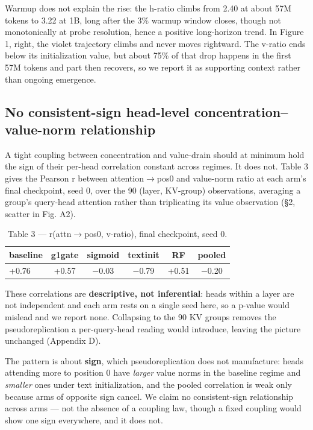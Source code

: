 \documentclass{article}
\begin{document}
Warmup does not explain the rise: the h-ratio climbs from 2.40 at about 57M tokens to 3.22 at 1B, long after the 3\% warmup window closes, though not monotonically at probe resolution, hence a positive long-horizon trend. In Figure 1, right, the violet trajectory climbs and never moves rightward. The v-ratio ends below its initialization value, but about 75\% of that drop happens in the first 57M tokens and part then recovers, so we report it as supporting context rather than ongoing emergence.

\subsection{No consistent-sign head-level concentration--value-norm relationship}

A tight coupling between concentration and value-drain should at minimum hold the sign of their per-head correlation constant across regimes. It does not. Table 3 gives the Pearson r between attention$\rightarrow$pos0 and value-norm ratio at each arm's final checkpoint, seed 0, over the 90 (layer, KV-group) observations, averaging a group's query-head attention rather than triplicating its value observation (\S2, scatter in Fig. A2).

\begin{table}[t]
  \centering
  \small
  \caption{Table 3 --- r(attn$\rightarrow$pos0, v-ratio), final checkpoint, seed 0.}
  \begin{tabular}{lccccc}
    \toprule
    baseline & g1gate & sigmoid & textinit & RF & pooled \\
    \midrule
    +0.76 & +0.57 & $-$0.03 & $-$0.79 & +0.51 & $-$0.20 \\
    \bottomrule
  \end{tabular}
\end{table}

These correlations are \textbf{descriptive, not inferential}: heads within a layer are not independent and each arm rests on a single seed here, so a p-value would mislead and we report none. Collapsing to the 90 KV groups removes the pseudoreplication a per-query-head reading would introduce, leaving the picture unchanged (Appendix D).

The pattern is about \textbf{sign}, which pseudoreplication does not manufacture: heads attending more to position 0 have \textit{larger} value norms in the baseline regime and \textit{smaller} ones under text initialization, and the pooled correlation is weak only because arms of opposite sign cancel. We claim no consistent-sign relationship across arms --- not the absence of a coupling law, though a fixed coupling would show one sign everywhere, and it does not.
\end{document}

